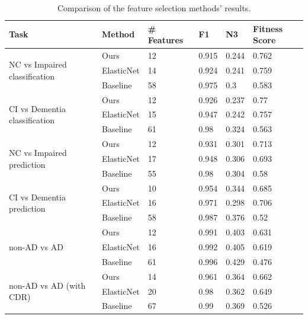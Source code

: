 \begin{table}[!ht]
    \centering
    \caption{Comparison of the feature selection methods' results.}
    \begin{tabular}{|l|l|l|l|l|l|}
    \hline
        Task & Method & \# Features & F1 & N3 & Fitness Score \\ \hline
        \multirow{3}{*}{NC vs Impaired classification} & Ours & 12 & 0.915 & 0.244 & 0.762 \\
        & ElasticNet & 14 & 0.924 & 0.241 & 0.759 \\ 
        & Baseline & 58 & 0.975 & 0.3 & 0.583 \\ \hline
        \multirow{3}{*}{CI vs Dementia classification} & Ours & 12 & 0.926 & 0.237 & 0.77 \\
        & ElasticNet & 15 & 0.947 & 0.242 & 0.757 \\
        & Baseline & 61 & 0.98 & 0.324 & 0.563 \\ \hline
        \multirow{3}{*}{NC vs Impaired prediction} & Ours & 12 & 0.931 & 0.301 & 0.713 \\
        & ElasticNet & 17 & 0.948 & 0.306 & 0.693 \\
        & Baseline & 55 & 0.98 & 0.304 & 0.58 \\ \hline
        \multirow{3}{*}{CI vs Dementia prediction} & Ours & 10 & 0.954 & 0.344 & 0.685 \\
        & ElasticNet & 16 & 0.971 & 0.298 & 0.706 \\
        & Baseline & 58 & 0.987 & 0.376 & 0.52 \\ \hline
        \multirow{3}{*}{non-AD vs AD} & Ours & 12 & 0.991 & 0.403 & 0.631 \\
        & ElasticNet & 16 & 0.992 & 0.405 & 0.619 \\
        & Baseline & 61 & 0.996 & 0.429 & 0.476 \\ \hline
        \multirow{3}{*}{non-AD vs AD (with CDR)} & Ours & 14 & 0.961 & 0.364 & 0.662 \\
        & ElasticNet & 20 & 0.98 & 0.362 & 0.649 \\
        & Baseline & 67 & 0.99 & 0.369 & 0.526 \\ \hline
    \end{tabular}
    \label{table:feature-selection-resutls}
\end{table}

